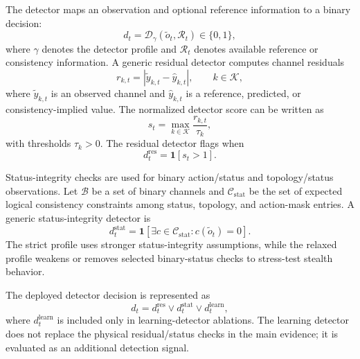 The detector maps an observation and optional reference information to a binary decision:
\begin{equation}
    d_t = \mathcal{D}_{\gamma}(\tilde{o}_t,\mathcal{R}_t)
    \in \{0,1\},
    \label{eq:detector}
\end{equation}
where $\gamma$ denotes the detector profile and $\mathcal{R}_t$ denotes available reference or consistency information. A generic residual detector computes channel residuals
\begin{equation}
    r_{k,t}
    =
    \left|
        \tilde{y}_{k,t}
        -
        \hat{y}_{k,t}
    \right|,
    \qquad
    k \in \mathcal{K},
    \label{eq:residuals}
\end{equation}
where $\tilde{y}_{k,t}$ is an observed channel and $\hat{y}_{k,t}$ is a reference, predicted, or consistency-implied value. The normalized detector score can be written as
\begin{equation}
    s_t
    =
    \max_{k \in \mathcal{K}}
    \frac{r_{k,t}}{\tau_k},
    \label{eq:detector_score}
\end{equation}
with thresholds $\tau_k>0$. The residual detector flags when
\begin{equation}
    d_t^{\mathrm{res}}
    =
    \mathbf{1}
    \left[
        s_t > 1
    \right].
    \label{eq:residual_detector}
\end{equation}

Status-integrity checks are used for binary action/status and topology/status observations. Let $\mathcal{B}$ be a set of binary channels and $\mathcal{C}_{\mathrm{stat}}$ be the set of expected logical consistency constraints among status, topology, and action-mask entries. A generic status-integrity detector is
\begin{equation}
    d_t^{\mathrm{stat}}
    =
    \mathbf{1}
    \left[
        \exists c \in \mathcal{C}_{\mathrm{stat}}
        :
        c(\tilde{o}_t) = 0
    \right].
    \label{eq:status_detector}
\end{equation}
The strict profile uses stronger status-integrity assumptions, while the relaxed profile weakens or removes selected binary-status checks to stress-test stealth behavior.

The deployed detector decision is represented as
\begin{equation}
    d_t
    =
    d_t^{\mathrm{res}}
    \lor
    d_t^{\mathrm{stat}}
    \lor
    d_t^{\mathrm{learn}},
    \label{eq:fused_detector}
\end{equation}
where $d_t^{\mathrm{learn}}$ is included only in learning-detector ablations. The learning detector does not replace the physical residual/status checks in the main evidence; it is evaluated as an additional detection signal.

